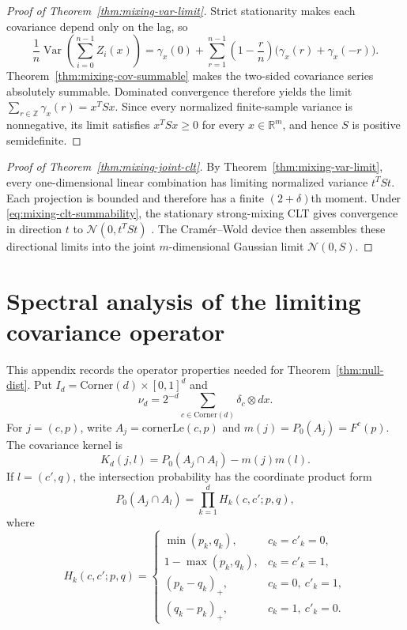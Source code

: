 \documentclass[pdflatex]{sn-jnl}
\theoremstyle{thmstyleone}
\theoremstyle{thmstyletwo}
\theoremstyle{thmstylethree}
\newcommand{\R}{\mathbb{R}}
\newcommand{\Z}{\mathbb{Z}}
\DeclareMathOperator{\Var}{Var}
\begin{document}
\begin{appendices}
\begin{proof}[Proof of Theorem~\ref{thm:mixing-var-limit}]
Strict stationarity makes each covariance depend only on the lag, so
\[
  \frac{1}{n}\Var\!\left(\sum_{i=0}^{n-1}Z_i(x)\right)
  =\gamma_x(0)+\sum_{r=1}^{n-1}\left(1-\frac{r}{n}\right)
    \bigl(\gamma_x(r)+\gamma_x(-r)\bigr).
\]
Theorem~\ref{thm:mixing-cov-summable} makes the two-sided covariance series absolutely summable. Dominated convergence therefore yields the limit $\sum_{r\in\Z}\gamma_x(r)=x^TSx$. Since every normalized finite-sample variance is nonnegative, its limit satisfies $x^TSx\ge0$ for every $x\in\R^m$, and hence $S$ is positive semidefinite.
\end{proof}

\begin{proof}[Proof of Theorem~\ref{thm:mixing-joint-clt}]
By Theorem~\ref{thm:mixing-var-limit}, every one-dimensional linear combination has limiting normalized variance $t^TSt$. Each projection is bounded and therefore has a finite $(2+\delta)$th moment. Under \eqref{eq:mixing-clt-summability}, the stationary strong-mixing CLT gives convergence in direction $t$ to $\mathcal N(0,t^TSt)$ \cite{Ibragimov1962,Doukhan1994,Rio2017}. The Cram\'er--Wold device then assembles these directional limits into the joint $m$-dimensional Gaussian limit $\mathcal N(0,S)$.
\end{proof}

\section{Spectral analysis of the limiting covariance operator}\label{app:spectral}

This appendix records the operator properties needed for Theorem~\ref{thm:null-dist}. Put $I_d=\mathrm{Corner}(d)\times[0,1]^d$ and
\[
  \nu_d=2^{-d}\sum_{c\in\mathrm{Corner}(d)}\delta_c\otimes dx.
\]
For $j=(c,p)$, write $A_j=\mathrm{cornerLe}(c,p)$ and $m(j)=P_0(A_j)=F^c(p)$. The covariance kernel is
\[
  K_d(j,l)=P_0(A_j\cap A_l)-m(j)m(l).
\]
If $l=(c',q)$, the intersection probability has the coordinate product form
\[
  P_0(A_j\cap A_l)=\prod_{k=1}^d H_k(c,c';p,q),
\]
where
\[
  H_k(c,c';p,q)=
  \begin{cases}
    \min(p_k,q_k), & c_k=c'_k=0,\\
    1-\max(p_k,q_k), & c_k=c'_k=1,\\
    (p_k-q_k)_+, & c_k=0,\ c'_k=1,\\
    (q_k-p_k)_+, & c_k=1,\ c'_k=0.
  \end{cases}
\]


\end{appendices}
\end{document}
